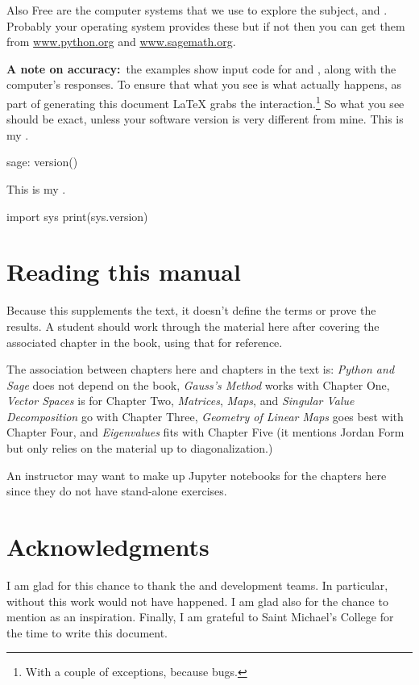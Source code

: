 Also Free are the computer systems that we use to explore the subject,
\python{} and \Sage{}.
Probably your operating system provides these but if not then 
you can get them from  
\href{http://www.python.org}{\url{www.python.org}}
and 
\href{https://www.sagemath.org}{\url{www.sagemath.org}}.

\textbf{A note on accuracy:}~the examples 
show input code for \python{} and \Sage{}, 
along with the computer's responses.
To ensure that what you see is what actually happens,
as part of generating this 
document \LaTeX{} grabs the interaction.\footnote{%
  With a couple of exceptions, because bugs.}
So what you see should be exact,
unless your software version is very different from mine.
This is my \Sage.
\begin{sagecommandline}
sage: version()  
\end{sagecommandline}
This is my \python{}. 
\begin{pythonconsole}
import sys
print(sys.version)
\end{pythonconsole}




\section{Reading this manual}
Because this supplements the text, 
it doesn't define the terms or prove the results.
A student should work through the material here after covering the associated
chapter in the book, using that for reference.

The association between chapters here and chapters in the text is:
\textit{Python and Sage} does not depend on the
book,
\textit{Gauss’s Method} works with Chapter One,
\textit{Vector Spaces} is for Chapter Two,
\textit{Matrices}, 
\textit{Maps}, and 
\textit{Singular Value Decomposition} go with Chapter Three,
\textit{Geometry of Linear Maps} goes best with Chapter Four,
and \textit{Eigenvalues} fits with Chapter Five
(it mentions Jordan Form but only relies on the material up to 
diagonalization.)

An instructor may want to make up Jupyter notebooks for the chapters here
since they do not have stand-alone exercises.




\section{Acknowledgments}
I am glad for this chance to thank the \python{} and
\Sage{} development teams.
In particular,
without \citep{SageTeam12ref} this work would not have happened.
I am glad also for the chance to mention 
\citep{Beezer11} as an inspiration.
Finally, I am grateful to Saint Michael's College for the 
time to write this document.





